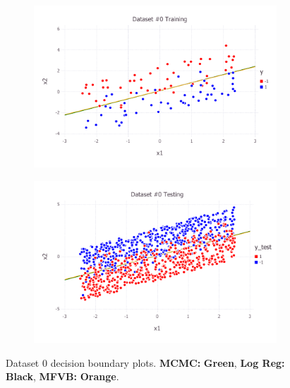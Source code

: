 \begin{figure}[h!]
\centering
    \begin{subfigure}[b]{0.45\textwidth}
	\includegraphics[scale=0.6]{figures/train_final_0.pdf}
    \end{subfigure}
    \quad
    \begin{subfigure}[b]{0.45\textwidth}
	\includegraphics[scale=0.6]{figures/test_final_0.pdf}
	\end{subfigure}
 \caption{Dataset 0 decision boundary plots. {\bf MCMC:}  {\bf \color{ao(english)} Green}, {\bf Log Reg:} {\bf \color{black} Black}, {\bf MFVB:}  {\bf \color{burntorange} Orange}.}  \label{fig:dataset_0}  
\end{figure}
